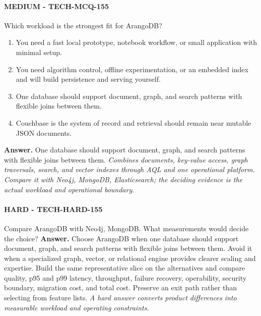 \paragraph{MEDIUM - TECH-MCQ-155} Which workload is the strongest fit for ArangoDB?
\begin{enumerate}[label=\Alph*.]
\item You need a fast local prototype, notebook workflow, or small application with minimal setup.
\item You need algorithm control, offline experimentation, or an embedded index and will build persistence and serving yourself.
\item One database should support document, graph, and search patterns with flexible joins between them.
\item Couchbase is the system of record and retrieval should remain near mutable JSON documents.
\end{enumerate}
\textbf{Answer.} One database should support document, graph, and search patterns with flexible joins between them.
\textit{Combines documents, key-value access, graph traversals, search, and vector indexes through AQL and one operational platform. Compare it with Neo4j, MongoDB, Elasticsearch; the deciding evidence is the actual workload and operational boundary.}
\paragraph{HARD - TECH-HARD-155} Compare ArangoDB with Neo4j, MongoDB. What measurements would decide the choice?
\textbf{Answer.} Choose ArangoDB when one database should support document, graph, and search patterns with flexible joins between them. Avoid it when a specialized graph, vector, or relational engine provides clearer scaling and expertise. Build the same representative slice on the alternatives and compare quality, p95 and p99 latency, throughput, failure recovery, operability, security boundary, migration cost, and total cost. Preserve an exit path rather than selecting from feature lists.
\textit{A hard answer converts product differences into measurable workload and operating constraints.}
